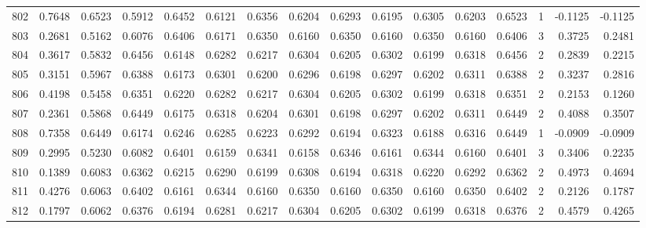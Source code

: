 \begin{tabular}{lrrrrrrrrrrrrrrr}
802 &      0.7648 &  0.6523 &  0.5912 &  0.6452 &  0.6121 &  0.6356 &  0.6204 &  0.6293 &  0.6195 &  0.6305 &   0.6203 &     0.6523 &      1 &                   -0.1125 &                    -0.1125 \\
803 &      0.2681 &  0.5162 &  0.6076 &  0.6406 &  0.6171 &  0.6350 &  0.6160 &  0.6350 &  0.6160 &  0.6350 &   0.6160 &     0.6406 &      3 &                    0.3725 &                     0.2481 \\
804 &      0.3617 &  0.5832 &  0.6456 &  0.6148 &  0.6282 &  0.6217 &  0.6304 &  0.6205 &  0.6302 &  0.6199 &   0.6318 &     0.6456 &      2 &                    0.2839 &                     0.2215 \\
805 &      0.3151 &  0.5967 &  0.6388 &  0.6173 &  0.6301 &  0.6200 &  0.6296 &  0.6198 &  0.6297 &  0.6202 &   0.6311 &     0.6388 &      2 &                    0.3237 &                     0.2816 \\
806 &      0.4198 &  0.5458 &  0.6351 &  0.6220 &  0.6282 &  0.6217 &  0.6304 &  0.6205 &  0.6302 &  0.6199 &   0.6318 &     0.6351 &      2 &                    0.2153 &                     0.1260 \\
807 &      0.2361 &  0.5868 &  0.6449 &  0.6175 &  0.6318 &  0.6204 &  0.6301 &  0.6198 &  0.6297 &  0.6202 &   0.6311 &     0.6449 &      2 &                    0.4088 &                     0.3507 \\
808 &      0.7358 &  0.6449 &  0.6174 &  0.6246 &  0.6285 &  0.6223 &  0.6292 &  0.6194 &  0.6323 &  0.6188 &   0.6316 &     0.6449 &      1 &                   -0.0909 &                    -0.0909 \\
809 &      0.2995 &  0.5230 &  0.6082 &  0.6401 &  0.6159 &  0.6341 &  0.6158 &  0.6346 &  0.6161 &  0.6344 &   0.6160 &     0.6401 &      3 &                    0.3406 &                     0.2235 \\
810 &      0.1389 &  0.6083 &  0.6362 &  0.6215 &  0.6290 &  0.6199 &  0.6308 &  0.6194 &  0.6318 &  0.6220 &   0.6292 &     0.6362 &      2 &                    0.4973 &                     0.4694 \\
811 &      0.4276 &  0.6063 &  0.6402 &  0.6161 &  0.6344 &  0.6160 &  0.6350 &  0.6160 &  0.6350 &  0.6160 &   0.6350 &     0.6402 &      2 &                    0.2126 &                     0.1787 \\
812 &      0.1797 &  0.6062 &  0.6376 &  0.6194 &  0.6281 &  0.6217 &  0.6304 &  0.6205 &  0.6302 &  0.6199 &   0.6318 &     0.6376 &      2 &                    0.4579 &                     0.4265 \\

\end{tabular}
